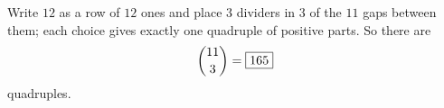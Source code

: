 Write $12$ as a row of $12$ ones and place $3$ dividers in $3$ of the $11$ gaps between them; each choice gives exactly one quadruple of positive parts. So there are
\[
\dbinom{11}{3}=\boxed{165}
\]
quadruples.
